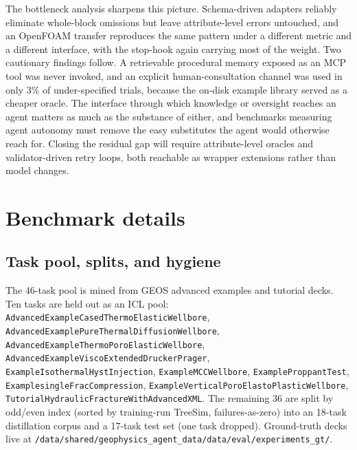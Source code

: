 \documentclass{article}
\begin{document}
The bottleneck analysis sharpens this picture. Schema-driven adapters reliably eliminate whole-block omissions but leave attribute-level errors untouched, and an OpenFOAM transfer reproduces the same pattern under a different metric and a different interface, with the stop-hook again carrying most of the weight. Two cautionary findings follow. A retrievable procedural memory exposed as an MCP tool was never invoked, and an explicit human-consultation channel was used in only $3\%$ of under-specified trials, because the on-disk example library served as a cheaper oracle. The interface through which knowledge or oversight reaches an agent matters as much as the substance of either, and benchmarks measuring agent autonomy must remove the easy substitutes the agent would otherwise reach for. Closing the residual gap will require attribute-level oracles and validator-driven retry loops, both reachable as wrapper extensions rather than model changes.

\medskip

{
\small
}





\appendix

\section{Benchmark details}
\label{app:bench}

\subsection{Task pool, splits, and hygiene}
The 46-task pool is mined from GEOS advanced examples and tutorial decks. Ten tasks are held out as an ICL pool: \texttt{AdvancedExampleCasedThermoElasticWellbore}, \texttt{AdvancedExamplePureThermalDiffusionWellbore}, \texttt{AdvancedExampleThermoPoroElasticWellbore}, \texttt{AdvancedExampleViscoExtendedDruckerPrager}, \texttt{ExampleIsothermalHystInjection}, \texttt{ExampleMCCWellbore}, \texttt{ExampleProppantTest}, \texttt{ExamplesingleFracCompression}, \texttt{ExampleVerticalPoroElastoPlasticWellbore}, \texttt{TutorialHydraulicFractureWithAdvancedXML}. The remaining 36 are split by odd/even index (sorted by training-run TreeSim, failures-as-zero) into an 18-task distillation corpus and a 17-task test set (one task dropped). Ground-truth decks live at \texttt{/data/shared/geophysics\_agent\_data/data/eval/experiments\_gt/}.
\end{document}
